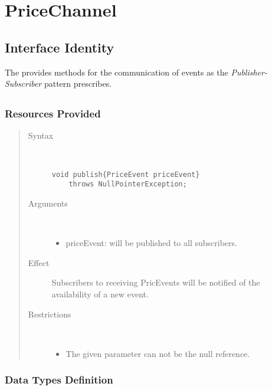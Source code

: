 \section{PriceChannel}
\label{api:other-pric-channel.tex}

\subsection{Interface Identity}

\npar The  provides methods for the communication of
events as the \emph{Publisher-Subscriber} pattern prescribes.

\subsection{}

\subsubsection{Resources Provided}

\begin{quote}
	\begin{description}
		\item[Syntax] \
		\begin{verbatim}
void publish{PriceEvent priceEvent}
    throws NullPointerException;
		\end{verbatim}
		\item[Arguments] \
		\begin{itemize}
		  \item priceEvent: will be published to all subscribers.
		\end{itemize}
		\item[Effect] Subscribers to receiving PricEvents will be notified of
		the availability of a new event. 
		\item[Restrictions] \
		\begin{itemize}
		  \item The given parameter can not be the null reference.
		\end{itemize}
	\end{description}
\end{quote}

\subsubsection{Data Types Definition}

